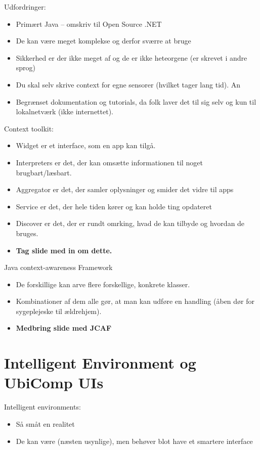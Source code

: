 \documentclass[oneside, 10pt]{article}
\begin{document}
Udfordringer:
\begin{itemize}
	\item Primært Java -- omskriv til Open Source .NET 
	\item De kan være meget komplekse og derfor sværre at bruge
	\item Sikkerhed er der ikke meget af og de er ikke heteorgene (er skrevet i andre sprog)
	\item Du skal selv skrive context for egne sensorer (hvilket tager lang tid). An
	\item Begrænset dokumentation og tutorials, da folk laver det til sig selv og kun til lokalnetværk (ikke internettet).
\end{itemize}

Context toolkit:
\begin{itemize}
	\item Widget er et interface, som en app kan tilgå.
	\item Interpreters er det, der kan omsætte informationen til noget brugbart/læsbart.
	\item Aggregator er det, der samler oplysninger og smider det vidre til apps
	\item Service er det, der hele tiden kører og kan holde ting opdateret
	\item Discover er det, der er rundt omrking, hvad de kan tilbyde og hvordan de bruges.
	\item \textbf{Tag slide med in om dette.}
\end{itemize}

Java context-awareness Framework
\begin{itemize}
	\item De forskillige  kan arve flere forskellige, konkrete klasser.
	\item Kombinationer af dem alle gør, at man kan udføre en handling (åben dør for sygeplejeske til ældrehjem).
	\item \textbf{Medbring slide med JCAF}
\end{itemize}


\section{Intelligent Environment og UbiComp UIs}

Intelligent environments:
\begin{itemize}
	\item Så småt en realitet
	\item De kan være (næsten usynlige), men behøver blot have et smartere interface
\end{itemize}
\end{document}
